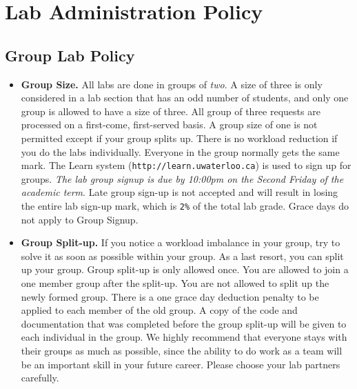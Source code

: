 \chapter*{Lab Administration Policy }

\section*{Group Lab Policy}

    \begin{itemize}
    \item {\bf Group Size.} All labs are done in groups of {\em two}. 
        A size of three is only considered in a lab section that has 
        an odd number of students, and only one group is allowed to have
        a size of three. All group of three requests are processed on
        a first-come, first-served basis. 
        A group size of one is not permitted except if your group
        splits up. There is no workload reduction if you do 
        the labs individually. 
        Everyone in the group normally gets the same mark.
        The Learn system (\verb+http://learn.uwaterloo.ca+)
        is used to sign up for groups.
        {\em The lab group signup is due by 10:00pm on the Second Friday of
        the academic term}. Late group sign-up is not accepted and will
        result in losing the entire lab sign-up mark, which is \verb+2%+
        of the total lab grade. Grace days do not apply to Group Signup.
	       
    \item {\bf Group Split-up.} 
            If you notice a workload imbalance in your group, try to solve it as soon as possible 
            within your group. As a last resort, you can split up your group. 
            Group split-up is only allowed once. You are allowed to join a one member group
            after the split-up. You are not allowed to split up the newly formed group.
            There is a one grace day deduction penalty to be applied to each member of the old group. 
            A copy of the code and documentation that was completed before the group split-up 
            will be given to each individual in the group.
            We highly recommend that everyone stays with their groups as much as possible,
            since the ability to do work as a team will be an important skill in your future career.
            Please choose your lab partners carefully. 
            

\end{itemize}
